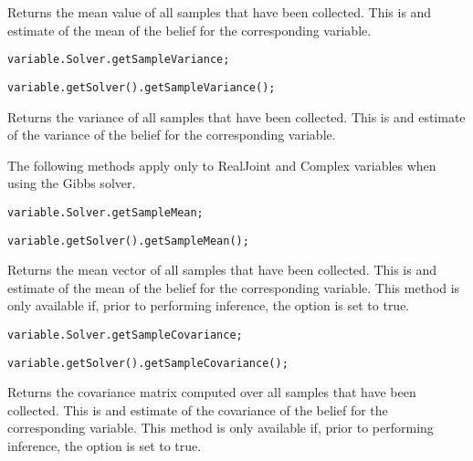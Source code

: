 Returns the mean value of all samples that have been collected.  This is and estimate of the mean of the belief for the corresponding variable.

\ifmatlab
\begin{lstlisting}
variable.Solver.getSampleVariance;
\end{lstlisting}
\fi

\ifjava
\begin{lstlisting}
variable.getSolver().getSampleVariance();
\end{lstlisting}
\fi

Returns the variance of all samples that have been collected.  This is and estimate of the variance of the belief for the corresponding variable.

\label{sec:RealJointVariableSpecificMethods}

The following methods apply only to RealJoint and Complex variables when using the Gibbs solver.

\ifmatlab
\begin{lstlisting}
variable.Solver.getSampleMean;
\end{lstlisting}
\fi

\ifjava
\begin{lstlisting}
variable.getSolver().getSampleMean();
\end{lstlisting}
\fi

Returns the mean vector of all samples that have been collected.  This is and estimate of the mean of the belief for the corresponding variable.  This method is only available if, prior to performing inference, the option   is set to true.

\ifmatlab
\begin{lstlisting}
variable.Solver.getSampleCovariance;
\end{lstlisting}
\fi

\ifjava
\begin{lstlisting}
variable.getSolver().getSampleCovariance();
\end{lstlisting}
\fi

Returns the covariance matrix computed over all samples that have been collected.  This is and estimate of the covariance of the belief for the corresponding variable.  This method is only available if, prior to performing inference, the option   is set to true.


